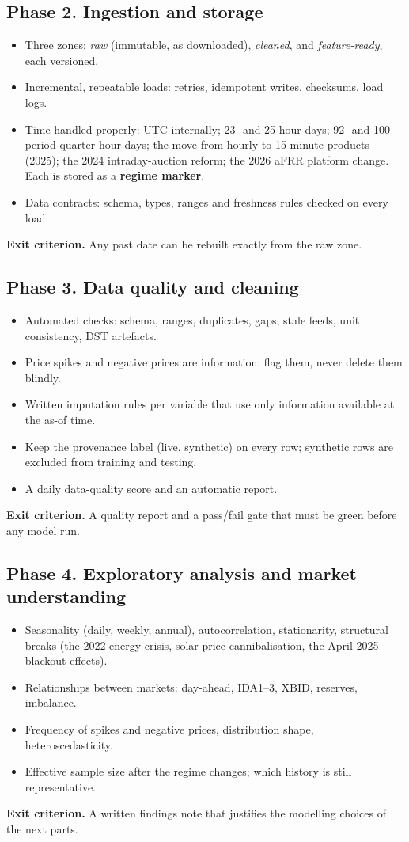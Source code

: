 \documentclass[11pt,a4paper]{article}
\newcommand{\exitcrit}[1]{\par\smallskip\noindent\colorbox{soft}{\parbox{\dimexpr\linewidth-2\fboxsep}{\textbf{Exit criterion.} #1}}\par}
\begin{document}
\subsection{Phase 2. Ingestion and storage}
\begin{itemize}
\item Three zones: \emph{raw} (immutable, as downloaded), \emph{cleaned}, and \emph{feature-ready}, each versioned.
\item Incremental, repeatable loads: retries, idempotent writes, checksums, load logs.
\item Time handled properly: UTC internally; 23- and 25-hour days; 92- and 100-period quarter-hour days;
  the move from hourly to 15-minute products (2025); the 2024 intraday-auction reform; the 2026 aFRR platform
  change. Each is stored as a \textbf{regime marker}.
\item Data contracts: schema, types, ranges and freshness rules checked on every load.
\end{itemize}
\exitcrit{Any past date can be rebuilt exactly from the raw zone.}

\subsection{Phase 3. Data quality and cleaning}
\begin{itemize}
\item Automated checks: schema, ranges, duplicates, gaps, stale feeds, unit consistency, DST artefacts.
\item Price spikes and negative prices are information: flag them, never delete them blindly.
\item Written imputation rules per variable that use only information available at the as-of time.
\item Keep the provenance label (live, synthetic) on every row; synthetic rows are excluded from training and testing.
\item A daily data-quality score and an automatic report.
\end{itemize}
\exitcrit{A quality report and a pass/fail gate that must be green before any model run.}

\subsection{Phase 4. Exploratory analysis and market understanding}
\begin{itemize}
\item Seasonality (daily, weekly, annual), autocorrelation, stationarity, structural breaks (the 2022 energy
  crisis, solar price cannibalisation, the April 2025 blackout effects).
\item Relationships between markets: day-ahead, IDA1--3, XBID, reserves, imbalance.
\item Frequency of spikes and negative prices, distribution shape, heteroscedasticity.
\item Effective sample size after the regime changes; which history is still representative.
\end{itemize}
\exitcrit{A written findings note that justifies the modelling choices of the next parts.}
\end{document}
